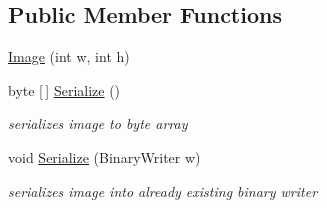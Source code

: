 \subsection*{Public Member Functions}
\begin{DoxyCompactItemize}
\item 
\mbox{\hyperlink{class_virt_muse_web_1_1_utility_1_1_image_ae05544069e19310301727b4b9edc917a}{Image}} (int w, int h)
\item 
byte \mbox{[}$\,$\mbox{]} \mbox{\hyperlink{class_virt_muse_web_1_1_utility_1_1_image_ac644e9eaee839b3bc66b48c6a5776118}{Serialize}} ()
\begin{DoxyCompactList}\small\item\em serializes image to byte array \end{DoxyCompactList}\item 
void \mbox{\hyperlink{class_virt_muse_web_1_1_utility_1_1_image_ae0ecd3ea4039b53bfe62c753b0669f2f}{Serialize}} (Binary\+Writer w)
\begin{DoxyCompactList}\small\item\em serializes image into already existing binary writer \end{DoxyCompactList}\end{DoxyCompactItemize}
